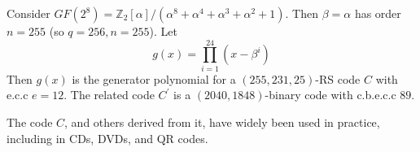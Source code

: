 \begin{exbox}
    \begin{example}
        Consider $ GF(2^8)=\mathbb{Z}_2[\alpha]/(\alpha^8+\alpha^4+\alpha^3+\alpha^2+1) $.
        Then $ \beta=\alpha $ has order $ n=255 $ (so $ q=256,n=255 $).
        Let
        \[ g(x)=\prod_{i=1}^{24}(x-\beta^i) \]
        Then $ g(x) $ is the generator polynomial for a $ (255,231,25) $-RS
        code $ C $ with e.c.c $ e=12 $. The related code $ C^{\prime} $
        is a $ (2040,1848) $-binary code with c.b.e.c.c $ 89 $.
    \end{example}
\end{exbox}
The code $ C $, and others derived from it, have widely been used in practice,
including in CDs, DVDs, and QR codes.
